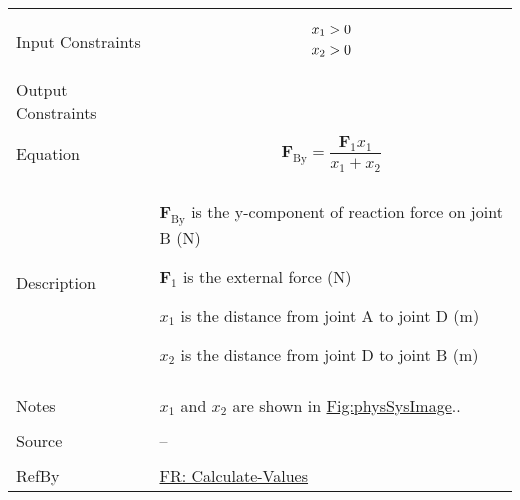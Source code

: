 \documentclass[12pt]{article}
\newcommand{\gt}{\ensuremath >}
\begin{document}
\begin{minipage}{\textwidth}
\begin{tabular}{>{\raggedright}p{}>{\raggedright\arraybackslash}p{}}
\\ \midrule \\
Input Constraints & \begin{displaymath}
                    {x_{\text{1}}}\gt{}0
                    \end{displaymath}
                    \begin{displaymath}
                    {x_{\text{2}}}\gt{}0
                    \end{displaymath}
\\ \midrule \\
Output Constraints & 
\\ \midrule \\
Equation & \begin{displaymath}
           {\mathbf{F}_{\text{By}}}=\frac{{\mathbf{F}_{1}} {x_{\text{1}}}}{{x_{\text{1}}}+{x_{\text{2}}}}
           \end{displaymath}
\\ \midrule \\
Description & \begin{symbDescription}
              \item{${\mathbf{F}_{\text{By}}}$ is the y-component of reaction force on joint B (${\text{N}}$)}
              \item{${\mathbf{F}_{1}}$ is the external force (${\text{N}}$)}
              \item{${x_{\text{1}}}$ is the distance from joint A to joint D (${\text{m}}$)}
              \item{${x_{\text{2}}}$ is the distance from joint D to joint B (${\text{m}}$)}
              \end{symbDescription}
\\ \midrule \\
Notes & ${x_{\text{1}}}$ and ${x_{\text{2}}}$ are shown in \hyperref[Figure:physSysImage]{Fig:physSysImage}..
        
\\ \midrule \\
Source & --
         
\\ \midrule \\
RefBy & \hyperref[calcValues]{FR: Calculate-Values}
        
\\ \bottomrule
\end{tabular}
\end{minipage}
\end{document}
